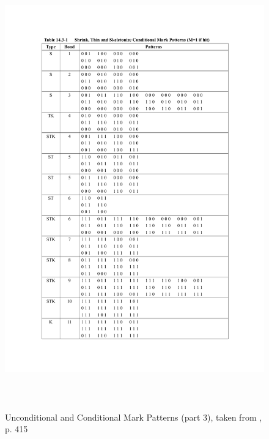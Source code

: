 \documentclass{article}
\begin{document}
\begin{figure}
 \includegraphics[page=3,height=19cm]{images/patternTables.pdf}
 \caption{Unconditional and Conditional Mark Patterns (part 3), taken from \cite{Pratt:2001:DIP:516234}, p. 415}
 \label{fig:markpatterns3}
\end{figure}




\end{document}
